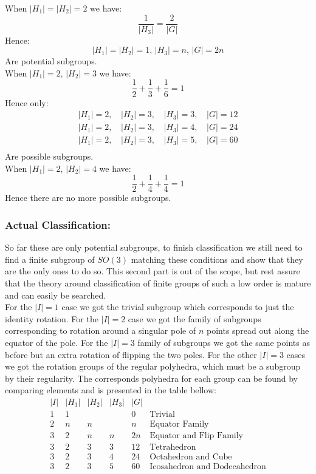 When $|H_1|=|H_2| = 2$ we have:
\[\frac{1}{|H_3|} = \frac{2}{|G|}\]
Hence:
\[|H_1| = |H_2| = 1,\,|H_3| = n,\, |G|=2n\]
Are potential subgroups.
\\

When $|H_1|=2,\,|H_2|=3$ we have:
\[\frac{1}{2}+\frac{1}{3}+\frac{1}{6} =1\]
Hence only:
\[\begin{matrix}
	|H_1| = 2,\,&|H_2|=3,\,&|H_3|=3,\,&|G|=12\\
	|H_1| = 2,\,&|H_2|=3,\,&|H_3|=4,\,&|G|=24\\
	|H_1| = 2,\,&|H_2|=3,\,&|H_3|=5,\,&|G|=60\\
\end{matrix}\]
Are possible subgroups.
\\

When $|H_1|=2,\,|H_2|=4$ we have:
\[\frac{1}{2}+\frac{1}{4}+\frac{1}{4} =1\]
Hence there are no more possible subgroups.

\subsubsection{Actual Classification:}
So far these are only potential subgroups,
to finish classification we still need to find a finite subgroup of $SO(3)$ matching these conditions and show that they are the only ones to do so.
This second part is out of the scope,
but rest assure that the theory around classification of finite groups of such a low order is mature and can easily be searched.
\\

For the $|I|=1$ case we got the trivial subgroup which corresponds to just the identity rotation.
For the $|I|=2$ case we got the family of subgroups corresponding to rotation around a singular pole of $n$ points spread out along the equator of the pole.
For the $|I|=3$ family of subgroups we got the same points as before but an extra rotation of flipping the two poles.
For the other $|I|=3$ cases we got the rotation groups of the regular polyhedra,
which must be a subgroup by their regularity.
The corresponds polyhedra for each group can be found by comparing elements and is presented in the table bellow:
\[\begin{matrix}
	|I|&|H_1|&|H_2|&|H_3|&|G|\\
	1&1& & &0  &\text{Trivial}\\
	2&n&n& &n  &\text{Equator Family}\\
	3&2&n&n&2n&\text{Equator and Flip Family}\\
	3&2&3&3&12&\text{Tetrahedron}\\
	3&2&3&4&24&\text{Octahedron and Cube}\\
	3&2&3&5&60&\text{Icosahedron and Dodecahedron}\\
\end{matrix}\]


